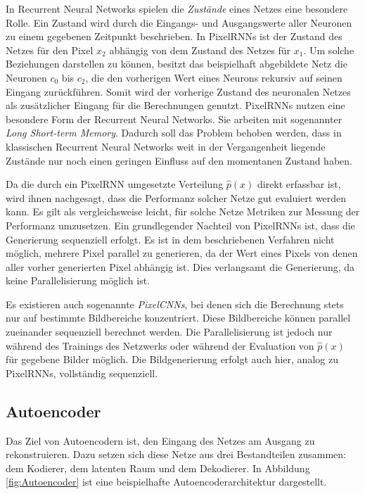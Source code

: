 In Recurrent Neural Networks spielen die \emph{Zustände} eines Netzes eine besondere Rolle. Ein Zustand wird durch die Eingangs- und Ausgangswerte aller Neuronen zu einem gegebenen Zeitpunkt beschrieben. In \acp{PixelRNN} ist der Zustand des Netzes für den Pixel $x_{2}$ abhängig von dem Zustand des Netzes für $x_{1}$. Um solche Beziehungen darstellen zu können, besitzt das beispielhaft abgebildete Netz die Neuronen $c_{0}$ bis $c_{2}$, die den vorherigen Wert eines Neurons rekursiv auf seinen Eingang zurückführen. Somit wird der vorherige Zustand des neuronalen Netzes als zusätzlicher Eingang für die Berechnungen genutzt. \acp{PixelRNN} nutzen eine besondere Form der Recurrent Neural Networks. Sie arbeiten mit sogenannter \emph{Long Short-term Memory}. Dadurch soll das Problem behoben werden, dass in klassischen Recurrent Neural Networks weit in der Vergangenheit liegende Zustände nur noch einen geringen Einfluss auf den momentanen Zustand haben. \cite{generativeModelsSurvey}

Da die durch ein \ac{PixelRNN} umgesetzte Verteilung $\hat{p}(x)$ direkt erfassbar ist, wird ihnen nachgesagt, dass die Performanz solcher Netze gut evaluiert werden kann. Es gilt als vergleichsweise leicht, für solche Netze Metriken zur Messung der Performanz umzusetzen. Ein grundlegender Nachteil von \acp{PixelRNN} ist, dass die Generierung sequenziell erfolgt. Es ist in dem beschriebenen Verfahren nicht möglich, mehrere Pixel parallel zu generieren, da der Wert eines Pixels von denen aller vorher generierten Pixel abhängig ist. Dies verlangsamt die Generierung, da keine Parallelisierung möglich ist. \cite{generativeModelsSurvey}

Es existieren auch sogenannte \emph{PixelCNNs}, bei denen sich die Berechnung stets nur auf bestimmte Bildbereiche konzentriert. Diese Bildbereiche können parallel zueinander sequenziell berechnet werden. Die Parallelisierung ist jedoch nur während des Trainings des Netzwerks oder während der Evaluation von $\hat{p}(x)$ für gegebene Bilder möglich. Die Bildgenerierung erfolgt auch hier, analog zu \acp{PixelRNN}, vollständig sequenziell. \cite{pixelRNN}

\subsection{Autoencoder}

Das Ziel von Autoencodern ist, den Eingang des Netzes am Ausgang zu rekonstruieren. Dazu setzen sich diese Netze aus drei Bestandteilen zusammen: dem Kodierer, dem latenten Raum und dem Dekodierer. In Abbildung \ref{fig:Autoencoder} ist eine beispielhafte Autoencoderarchitektur dargestellt.

